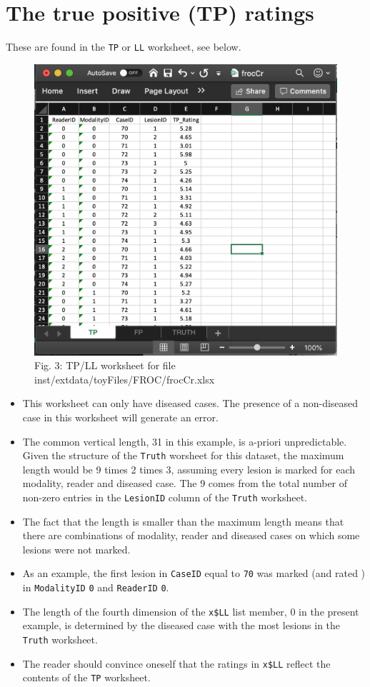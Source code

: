 \documentclass[
]{book}
\providecommand{\tightlist}{%
  \setlength{\itemsep}{0pt}\setlength{\parskip}{0pt}}
\begin{document}
\hypertarget{the-true-positive-tp-ratings}{%
\section{The true positive (TP) ratings}\label{the-true-positive-tp-ratings}}

These are found in the \texttt{TP} or \texttt{LL} worksheet, see below.

\begin{figure}

{\centering \includegraphics[width=0.5\linewidth,height=0.2\textheight]{images/frocCrLL} 

}

\caption{Fig. 3: TP/LL worksheet for file inst/extdata/toyFiles/FROC/frocCr.xlsx}\label{fig:frocCrLL}
\end{figure}

\begin{itemize}
\tightlist
\item
  This worksheet can only have diseased cases. The presence of a non-diseased case in this worksheet will generate an error.
\item
  The common vertical length, 31 in this example, is a-priori unpredictable. Given the structure of the \texttt{Truth} worsheet for this dataset, the maximum length would be 9 times 2 times 3, assuming every lesion is marked for each modality, reader and diseased case. The 9 comes from the total number of non-zero entries in the \texttt{LesionID} column of the \texttt{Truth} worksheet.
\item
  The fact that the length is smaller than the maximum length means that there are combinations of modality, reader and diseased cases on which some lesions were not marked.
\item
  As an example, the first lesion in \texttt{CaseID} equal to \texttt{70} was marked (and rated ) in \texttt{ModalityID} \texttt{0} and \texttt{ReaderID} \texttt{0}.
\item
  The length of the fourth dimension of the \texttt{x\$LL} list member, 0 in the present example, is determined by the diseased case with the most lesions in the \texttt{Truth} worksheet.
\item
  The reader should convince oneself that the ratings in \texttt{x\$LL} reflect the contents of the \texttt{TP} worksheet.
\end{itemize}
\end{document}
